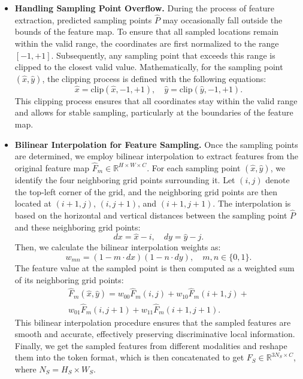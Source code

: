 \begin{itemize}
    \item \textbf{Handling Sampling Point Overflow.}
    During the process of feature extraction, predicted sampling points \(\hat{P}\) may occasionally fall outside the bounds of the feature map.
    To ensure that all sampled locations remain within the valid range, the coordinates are first normalized to the range \([-1, +1]\).
    Subsequently, any sampling point that exceeds this range is clipped to the closest valid value.
    Mathematically, for the sampling point $(\hat{x}, \hat{y})$, the clipping process is defined with the following equations:
    \begin{equation}
    \hat{x} = \text{clip}(\hat{x}, -1, +1), \quad \hat{y} = \text{clip}(\hat{y}, -1, +1).
    \end{equation}
    This clipping process ensures that all coordinates stay within the valid range and allows for stable sampling, particularly at the boundaries of the feature map.

    \item \textbf{Bilinear Interpolation for Feature Sampling.}
    Once the sampling points are determined, we employ bilinear interpolation to extract features from the original feature map \(\hat{F}_m \in \mathbb{R}^{H \times W \times C}\). For each sampling point \((\hat{x}, \hat{y})\), we identify the four neighboring grid points surrounding it.
    Let \((i, j)\) denote the top-left corner of the grid, and the neighboring grid points are then located at \((i+1, j)\), \((i, j+1)\), and \((i+1, j+1)\).
    The interpolation is based on the horizontal and vertical distances between the sampling point \(\hat{P}\) and these neighboring grid points:
    \begin{equation}
    dx = \hat{x} - i, \quad dy = \hat{y} - j.
    \end{equation}
    Then, we calculate the bilinear interpolation weights as:
    \begin{equation}
    w_{mn} = (1 - m \cdot dx)(1 - n \cdot dy), \quad m, n \in \{0, 1\}.
    \end{equation}
    The feature value at the sampled point is then computed as a weighted sum of its neighboring grid points:
    \begin{equation}
      \begin{aligned}
        \hat{F}_m(\hat{x}, \hat{y}) = w_{00}\hat{F}_m(i, j) + w_{10}\hat{F}_m(i+1, j) + \\
        w_{01}\hat{F}_m(i, j+1) + w_{11}\hat{F}_m(i+1, j+1).
      \end{aligned}
  \end{equation}
    This bilinear interpolation procedure ensures that the sampled features are smooth and accurate, effectively preserving discriminative local information.
%
Finally, we get the sampled features from different modalities and reshape them into the token format, which is then concatenated to get \( F_{S} \in \mathbb{R}^{3N_{S} \times C} \), where \( N_{S} = H_{S} \times W_{S} \).
\end{itemize}
